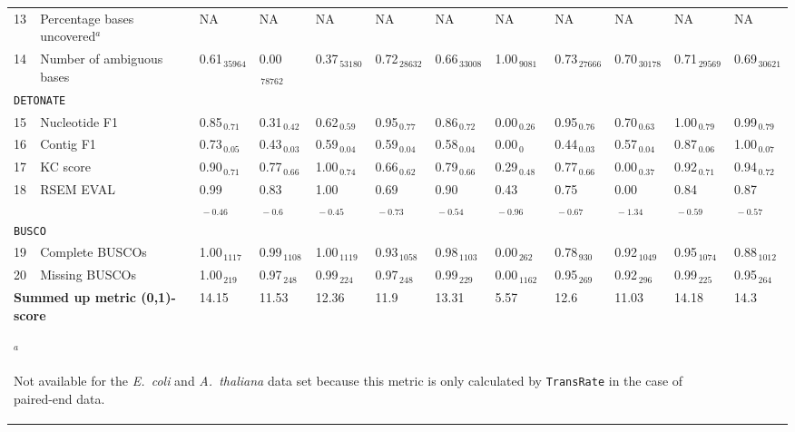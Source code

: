 \documentclass{scrartcl}
\begin{document}
\begin{landscape}
\begin{table}
\begin{scriptsize}
\begin{tabular}{llllllllllll}
13 & Percentage bases uncovered$^{a}$  & NA & NA & NA & NA & NA & NA & NA & NA & NA & NA\\ 
14 & Number of ambiguous bases  & 0.61$_{\,35964}$ & 0.00$_{\,78762}$ & 0.37$_{\,53180}$ & 0.72$_{\,28632}$ & 0.66$_{\,33008}$ & 1.00$_{\,9081}$ & 0.73$_{\,27666}$ & 0.70$_{\,30178}$ & 0.71$_{\,29569}$ & 0.69$_{\,30621}$ \\\midrule
\multicolumn{11}{l}{\texttt{DETONATE}}\\ 
\midrule
15 & Nucleotide F1  & 0.85$_{\,0.71}$ & 0.31$_{\,0.42}$ & 0.62$_{\,0.59}$ & 0.95$_{\,0.77}$ & 0.86$_{\,0.72}$ & 0.00$_{\,0.26}$ & 0.95$_{\,0.76}$ & 0.70$_{\,0.63}$ & 1.00$_{\,0.79}$ & 0.99$_{\,0.79}$ \\16 & Contig F1  & 0.73$_{\,0.05}$ & 0.43$_{\,0.03}$ & 0.59$_{\,0.04}$ & 0.59$_{\,0.04}$ & 0.58$_{\,0.04}$ & 0.00$_{\,0}$ & 0.44$_{\,0.03}$ & 0.57$_{\,0.04}$ & 0.87$_{\,0.06}$ & 1.00$_{\,0.07}$ \\17 & KC score  & 0.90$_{\,0.71}$ & 0.77$_{\,0.66}$ & 1.00$_{\,0.74}$ & 0.66$_{\,0.62}$ & 0.79$_{\,0.66}$ & 0.29$_{\,0.48}$ & 0.77$_{\,0.66}$ & 0.00$_{\,0.37}$ & 0.92$_{\,0.71}$ & 0.94$_{\,0.72}$ \\18 & RSEM EVAL  & 0.99$_{\,-0.46}$ & 0.83$_{\,-0.6}$ & 1.00$_{\,-0.45}$ & 0.69$_{\,-0.73}$ & 0.90$_{\,-0.54}$ & 0.43$_{\,-0.96}$ & 0.75$_{\,-0.67}$ & 0.00$_{\,-1.34}$ & 0.84$_{\,-0.59}$ & 0.87$_{\,-0.57}$ \\\midrule
\multicolumn{11}{l}{\texttt{BUSCO}}\\ 
\midrule
19 & Complete BUSCOs  & 1.00$_{\,1117}$ & 0.99$_{\,1108}$ & 1.00$_{\,1119}$ & 0.93$_{\,1058}$ & 0.98$_{\,1103}$ & 0.00$_{\,262}$ & 0.78$_{\,930}$ & 0.92$_{\,1049}$ & 0.95$_{\,1074}$ & 0.88$_{\,1012}$ \\20 & Missing BUSCOs  & 1.00$_{\,219}$ & 0.97$_{\,248}$ & 0.99$_{\,224}$ & 0.97$_{\,248}$ & 0.99$_{\,229}$ & 0.00$_{\,1162}$ & 0.95$_{\,269}$ & 0.92$_{\,296}$ & 0.99$_{\,225}$ & 0.95$_{\,264}$ \\\midrule
\multicolumn{2}{l}{\textbf{Summed up metric (0,1)-score}}&14.15&11.53&12.36&11.9&13.31&5.57&12.6&11.03&14.18&14.3\\\bottomrule
\multicolumn{11}{l}{$^{a}$\begin{scriptsize}Not available for the \emph{E.~coli} and \emph{A.~thaliana} data set because this metric is only calculated by \texttt{TransRate} in the case of paired-end data.\end{scriptsize}}\\\end{tabular}\end{scriptsize}
\end{table}
\end{landscape}
\end{document}
